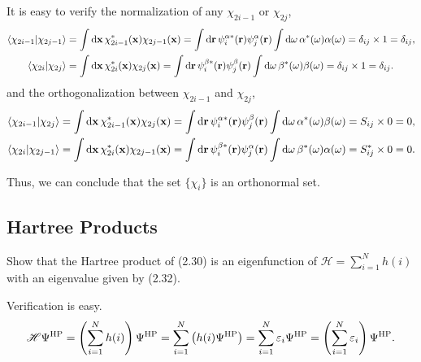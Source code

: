 \documentclass[a4paper]{book}
\newcommand*{\dif}{\mathop{}\!\mathrm{d}}
\newcommand{\bfr}{{\bf r}}
\newcommand{\bfx}{{\bf x}}
\newcommand{\HP}{{\rm HP}}
\begin{document}
	\begin{solution}
	It is easy to verify the normalization of any $\chi_{2i-1}$ or $\chi_{2j}$, 
	\begin{align}
		\langle \chi_{2i-1} | \chi_{2j-1} \rangle &= \int \dif \bfx \, \chi^*_{2i-1}( \bfx ) \chi_{2j-1}( \bfx ) = \int \dif \bfr \, \psi^{\alpha*}_i( \bfr ) \psi^\alpha_j( \bfr ) \int \dif \omega \, \alpha^*( \omega ) \alpha( \omega) = \delta_{ij} \times 1 = \delta_{ij} , \\
		\langle \chi_{2i} | \chi_{2j} \rangle &= \int \dif \bfx \, \chi^*_{2i}( \bfx ) \chi_{2j}( \bfx ) = \int \dif \bfr \, \psi^{\beta*}_i( \bfr ) \psi^\beta_j( \bfr ) \int \dif \omega \, \beta^*( \omega ) \beta( \omega) = \delta_{ij} \times 1 = \delta_{ij}.
	\end{align}
	and the orthogonalization between $\chi_{2i-1}$ and $\chi_{2j}$,
	\begin{align}
		\langle \chi_{2i-1} | \chi_{2j} \rangle &= \int \dif \bfx \, \chi^*_{2i-1}( \bfx ) \chi_{2j}( \bfx ) = \int \dif \bfr \, \psi^{\alpha*}_i( \bfr ) \psi^\beta_j( \bfr ) \int \dif \omega \, \alpha^*( \omega ) \beta( \omega) = S_{ij} \times 0 = 0 , \\
		\langle \chi_{2i} | \chi_{2j-1} \rangle &= \int \dif \bfx \, \chi^*_{2i}( \bfx ) \chi_{2j-1}( \bfx ) = \int \dif \bfr \, \psi^{\beta*}_i( \bfr ) \psi^\alpha_j( \bfr ) \int \dif \omega \, \beta^*( \omega ) \alpha( \omega) = S^*_{ij} \times 0 = 0 .
	\end{align}	
	
	Thus, we can conclude that the set $\{ \chi_i \}$ is an orthonormal set.	
	\end{solution}
	
	\subsection{Hartree Products}
	
	\begin{exercise}
	Show that the Hartree product of (2.30) is an eigenfunction of $\mathscr{H} = \displaystyle\sum_{i=1}^N h(i)$ with an eigenvalue given by (2.32).
	\end{exercise}
	
	\begin{solution}
	Verification is easy.
	\begin{equation}
		\mathscr{H} \Psi^\HP = \left( \sum_{i=1}^N h(i) \right) \Psi^\HP = \sum_{i=1}^N \left( h(i) \Psi^\HP \right) = \sum_{i=1}^N \varepsilon_i \Psi^\HP = \left( \sum_{i=1}^N \varepsilon_i \right) \Psi^\HP.
	\end{equation}
	\end{solution}
	
\end{document}
